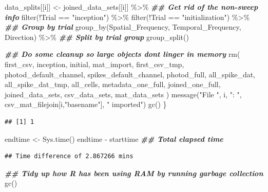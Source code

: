 \documentclass[
]{book}
\newenvironment{Shaded}{\begin{snugshade}}{\end{snugshade}}
\newcommand{\DocumentationTok}[1]{\textcolor[rgb]{0.56,0.35,0.01}{\textbf{\textit{#1}}}}
\newcommand{\FunctionTok}[1]{\textcolor[rgb]{0.00,0.00,0.00}{#1}}
\newcommand{\NormalTok}[1]{#1}
\newcommand{\OtherTok}[1]{\textcolor[rgb]{0.56,0.35,0.01}{#1}}
\newcommand{\SpecialCharTok}[1]{\textcolor[rgb]{0.00,0.00,0.00}{#1}}
\newcommand{\StringTok}[1]{\textcolor[rgb]{0.31,0.60,0.02}{#1}}
\begin{document}
\begin{Shaded}
\begin{Highlighting}[]
\NormalTok{  data\_splits[[i]] }\OtherTok{\textless{}{-}}
\NormalTok{    joined\_data\_sets[[i]] }\SpecialCharTok{\%\textgreater{}\%}
    \DocumentationTok{\#\# Get rid of the non{-}sweep info}
    \FunctionTok{filter}\NormalTok{(}\SpecialCharTok{!}\NormalTok{Trial }\SpecialCharTok{==} \StringTok{"inception"}\NormalTok{) }\SpecialCharTok{\%\textgreater{}\%}
    \FunctionTok{filter}\NormalTok{(}\SpecialCharTok{!}\NormalTok{Trial }\SpecialCharTok{==} \StringTok{"initialization"}\NormalTok{) }\SpecialCharTok{\%\textgreater{}\%}
    \DocumentationTok{\#\# Group by trial}
    \FunctionTok{group\_by}\NormalTok{(Spatial\_Frequency, Temporal\_Frequency, Direction) }\SpecialCharTok{\%\textgreater{}\%}
    \DocumentationTok{\#\# Split by trial group}
    \FunctionTok{group\_split}\NormalTok{()}

  \DocumentationTok{\#\# Do some cleanup so large objects don\textquotesingle{}t linger in memory}
  \FunctionTok{rm}\NormalTok{(}
\NormalTok{    first\_csv, inception, initial, mat\_import, first\_csv\_tmp,}
\NormalTok{    photod\_default\_channel, spikes\_default\_channel, photod\_full,}
\NormalTok{    all\_spike\_dat, all\_spike\_dat\_tmp, all\_cells,}
\NormalTok{    metadata\_one\_full, joined\_one\_full, joined\_data\_sets,}
\NormalTok{    csv\_data\_sets, mat\_data\_sets}
\NormalTok{  )}
  \FunctionTok{message}\NormalTok{(}\StringTok{"File "}\NormalTok{, i, }\StringTok{": "}\NormalTok{, csv\_mat\_filejoin[i,}\StringTok{"basename"}\NormalTok{], }\StringTok{" imported"}\NormalTok{)}
  \FunctionTok{gc}\NormalTok{()}
\NormalTok{\}}
\end{Highlighting}
\end{Shaded}

\begin{verbatim}
## [1] 1
\end{verbatim}

\begin{Shaded}
\begin{Highlighting}[]
\NormalTok{endtime }\OtherTok{\textless{}{-}} \FunctionTok{Sys.time}\NormalTok{()}
\NormalTok{endtime }\SpecialCharTok{{-}}\NormalTok{ starttime }\DocumentationTok{\#\# Total elapsed time}
\end{Highlighting}
\end{Shaded}

\begin{verbatim}
## Time difference of 2.867266 mins
\end{verbatim}

\begin{Shaded}
\begin{Highlighting}[]
\DocumentationTok{\#\# Tidy up how R has been using RAM by running garbage collection}
\FunctionTok{gc}\NormalTok{()}
\end{Highlighting}
\end{Shaded}
\end{document}
